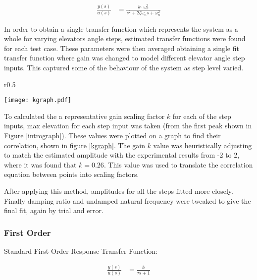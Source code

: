 \begin{align}
\frac{ y(s) }{ u(s) } &=\frac{ k\cdot \omega_{ n }^{ 2 } }{ s^{ 2 }+2\zeta \omega_{ n }s+\omega_{ n }^{ 2 } }
\label{2otsf}
\end{align}

In order to obtain a single transfer function which represents the
system as a whole for varying elevators angle steps, estimated transfer
functions were found for each test case. These parameters were then
averaged obtaining a single fit transfer function where gain was changed
to model different elevator angle step inputs. This captured some of the
behaviour of the system as step level varied.

\begin{wrapfigure}{r}{0.5\textwidth}
  \begin{center}
  \vspace{0pt}
\texttt{[image: kgraph.pdf]}  
\end{center}
\caption{Graph Finding the Gain For Each Step Input}
\label{kgraph}
  \vspace{0pt}
\end{wrapfigure}

To calculated the a representative gain scaling factor \(k\) for each of
the step inputs, max elevation for each step input was taken (from the
first peak shown in Figure \ref{intrograph}). These values were plotted
on a graph to find their correlation, shown in figure \ref{kgraph}. The
gain \(k\) value was heuristically adjusting to match the estimated
amplitude with the experimental results from -2 to 2, where it was found
that \(k = 0.26\). This value was used to translate the correlation
equation between points into scaling factors.

After applying this method, amplitudes for all the steps fitted more
closely. Finally damping ratio and undamped natural frequency were
tweaked to give the final fit, again by trial and error.

\subsubsection{First Order}\label{first-order}

Standard First Order Response Transfer Function:

\begin{align}
 \frac { y(s) }{ u(s) } &=\frac { k }{ \tau s+1 }
\label{fos}
\end{align}


